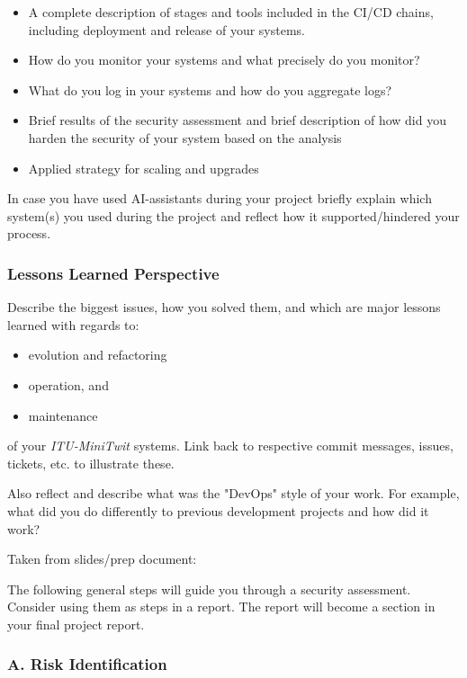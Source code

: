 \begin{itemize}
    \item A complete description of stages and tools included in the CI/CD chains, including deployment and release of your systems.
    \item How do you monitor your systems and what precisely do you monitor?
    \item What do you log in your systems and how do you aggregate logs?
    \item Brief results of the security assessment and brief description of how did you harden the security of your system based on the analysis
    \item Applied strategy for scaling and upgrades
\end{itemize}
In case you have used AI-assistants during your project briefly explain which system(s) you used during the project and reflect how it supported/hindered your process.

\subsubsection{Lessons Learned Perspective}

Describe the biggest issues, how you solved them, and which are major lessons learned with regards to:

\begin{itemize}
    \item evolution and refactoring
    \item operation, and
    \item maintenance
\end{itemize}
of your \textit{ITU-MiniTwit} systems. Link back to respective commit messages, issues, tickets, etc. to illustrate these.

Also reflect and describe what was the "DevOps" style of your work. For example, what did you do differently to previous development projects and how did it work?


 Taken from slides/prep document:

The following general steps will guide you through a security assessment. Consider using them as steps in a report. The report will become a section in your final project report.

\subsubsection{A. Risk Identification}

